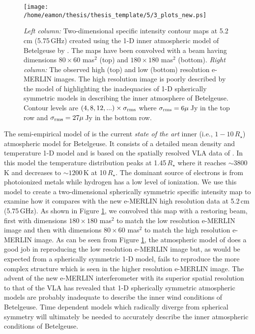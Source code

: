 \begin{figure}[!t]
\centering 
          \texttt{[image: /home/eamon/thesis/thesis\_template/5/3\_plots\_new.ps]}
\caption[1-D model vs. e-MERLIN observations]{\textit{Left column:} Two-dimensional specific intensity contour maps at 5.2\,cm (5.75\,GHz) created using the 1-D inner atmospheric model of Betelgeuse by \cite{harper_2001}. The maps have been convolved with a beam having dimensions $80\times 60$ mas$^2$ (top) and $180\times 180$ mas$^2$ (bottom). \textit{Right column:} The observed high (top) and low (bottom) resolution e-MERLIN images. The high resolution image is poorly described by the model of \cite{harper_2001} highlighting the inadequacies of 1-D spherically symmetric models in describing the inner atmosphere of Betelgeuse. Contour levels are $(4,8,12,...)\times \sigma _{\rm{rms}}$ where $\sigma _{\rm{rms}} = 6\mu$\,Jy in the top row and $\sigma _{\rm{rms}} = 27\mu$\,Jy in the bottom row.}
\label{fig:5.15}
\end{figure}

The semi-empirical model of \cite{harper_2001} is the current \textit{state of the art} inner (i.e., $1 - 10\,R_{\star}$) atmospheric model for Betelgeuse. It consists of a detailed mean density and temperature 1-D model and is based on the spatially resolved VLA data of \cite{lim_1998}. In this model the temperature distribution peaks at 1.45\,$R_{\star}$ where it reaches $\sim 3800$\,K and decreases to $\sim 1200$\,K at 10\,$R_{\star}$. The dominant source of electrons is from photoionized metals while hydrogen has a low level of ionization. 
We use this model to create a two-dimensional spherically symmetric specific intensity map to examine how it compares with the new e-MERLIN high resolution data at 5.2\,cm (5.75\,GHz). As shown in Figure \ref{fig:5.15}, we convolved this map with a restoring beam, first with dimensions $180\times 180$ mas$^2$ to match the low resolution e-MERLIN image and then with dimensions $80\times 60$ mas$^2$ to match the high resolution e-MERLIN image. As can be seen from Figure  \ref{fig:5.15}, the atmospheric model of \cite{harper_2001} does a good job in reproducing the low resolution e-MERLIN image but, as would be expected from a spherically symmetric 1-D model, fails to reproduce the more complex structure which is seen in the higher resolution e-MERLIN image. The advent of the new e-MERLIN interferometer with its superior spatial resolution to that of the VLA has revealed that 1-D spherically symmetric atmospheric models are probably inadequate to describe the inner wind conditions of Betelgeuse. Time dependent models which radically diverge from spherical symmetry will ultimately be needed to accurately describe the inner atmospheric conditions of Betelgeuse.

